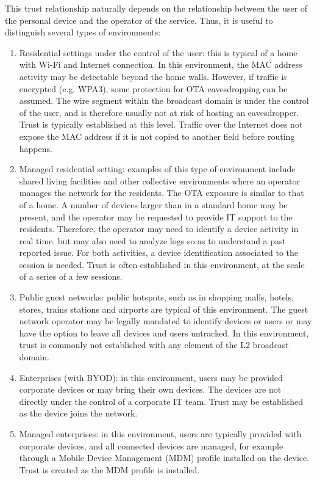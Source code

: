 \documentclass[10pt]{article}
\begin{document}
{This trust relationship naturally depends on the relationship between the user of the personal device and the operator of the service. Thus, it is useful to distinguish several types of environments:

\renewcommand{\labelenumi}{\alph{enumi})}
\begin{enumerate}
    \item Residential settings under the control of the user: this is typical of a home with Wi-Fi and Internet connection. In this environment, the MAC address activity may be detectable beyond the home walls. However, if traffic is encrypted (e.g. WPA3), some protection for OTA eavesdropping can be assumed. The wire segment within the broadcast domain is under the control of the user, and is therefore usually not at risk of hosting an eavesdropper. Trust is typically established at this level. Traffic over the Internet does not expose the MAC address if it is not copied to another field before routing happens.
    \item Managed residential setting: examples of this type of environment include shared living facilities and other collective environments where an operator manages the network for the residents. The OTA exposure is similar to that of a home. A number of devices larger than in a standard home may be present, and the operator may be requested to provide IT support to the residents. Therefore, the operator may need to identify a device activity in real time, but may also need to analyze logs so as to understand a past reported issue. For both activities, a device identification associated to the session is needed. Trust is often established in this environment, at the scale of a series of a few sessions.
    \item Public guest networks: public hotspots, such as in shopping malls, hotels, stores, trains stations and airports are typical of this environment. The guest network operator may be legally mandated to identify devices or users or may have the option to leave all devices and users untracked. In this environment, trust is commonly not established with any element of the L2 broadcast domain.
    \item Enterprises (with BYOD): in this environment, users may be provided corporate devices or may bring their own devices. The devices are not directly under the control of a corporate IT team. Trust may be established as the device joins the network.
    \item Managed enterprises: in this environment, users are typically provided with corporate devices, and all connected devices are managed, for example through a Mobile Device Management (MDM) profile installed on the device. Trust is created as the MDM profile is installed. 
\end{enumerate}


}
\end{document}
